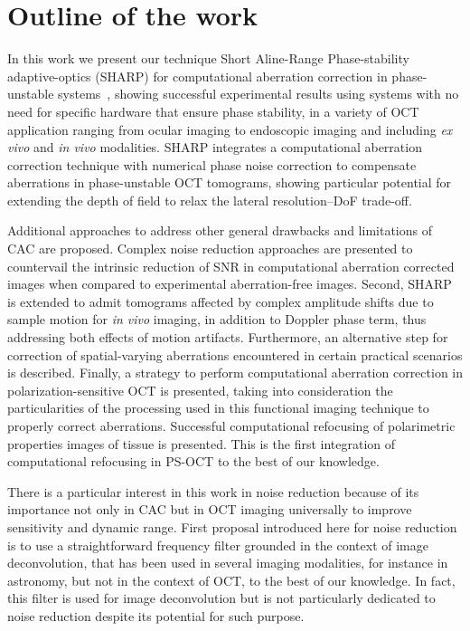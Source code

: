 \section{Outline of the work}

In this work we present our technique Short Aline-Range Phase-stability adaptive-optics (SHARP) for computational aberration correction in phase-unstable systems~\cite{Ruiz-Lopera2020_Computational}, showing successful experimental results using systems with no need for specific hardware that ensure phase stability, in a variety of OCT application ranging from ocular imaging to endoscopic imaging and including \textit{ex vivo} and \textit{in vivo} modalities. SHARP integrates a computational aberration correction technique with numerical phase noise correction to compensate aberrations in phase-unstable OCT tomograms, showing particular potential for extending the depth of field to relax the lateral resolution--DoF trade-off.

Additional approaches to address other general drawbacks and limitations of CAC are proposed. Complex noise reduction approaches are presented to countervail the intrinsic reduction of SNR in computational aberration corrected images when compared to experimental aberration-free images. Second, SHARP is extended to admit tomograms affected by complex amplitude shifts due to sample motion for \textit{in vivo} imaging, in addition to Doppler phase term, thus addressing both effects of motion artifacts. Furthermore, an alternative step for correction of spatial-varying aberrations encountered in certain practical scenarios is described. Finally, a strategy to perform computational aberration correction in polarization-sensitive OCT is presented, taking into consideration the particularities of the processing used in this functional imaging technique to properly correct aberrations. Successful computational refocusing of polarimetric properties images of tissue is presented. This is the first integration of computational refocusing in PS-OCT to the best of our knowledge.

There is a particular interest in this work in noise reduction because of its importance not only in CAC but in OCT imaging universally to improve sensitivity and dynamic range. First proposal introduced here for noise reduction is to use a straightforward frequency filter grounded in the context of image deconvolution, that has been used in several imaging modalities, for instance in astronomy, but not in the context of OCT, to the best of our knowledge. In fact, this filter is used for image deconvolution but is not particularly dedicated to noise reduction despite its potential for such purpose.

